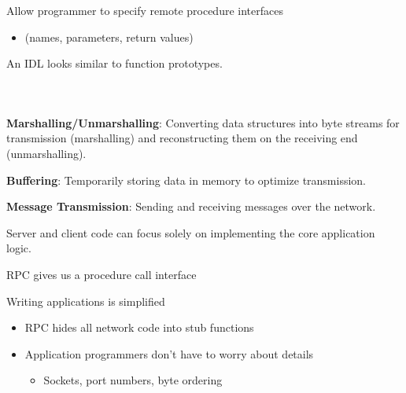 \begin{slide}

	
	Allow programmer to specify remote procedure interfaces
	\begin{itemize}
		\item (names, parameters, return values)
	\end{itemize}

	An IDL looks similar to function prototypes.
	
\end{slide}

\begin{slide}


    \inputminted{python}{Adder.idl}

\end{slide}

\begin{slide}


    \inputminted{python}{server.py}
    \bigskip

    \inputminted{python}{client.py}

\end{slide}

\begin{slide}

    
    \textbf{Marshalling/Unmarshalling}: Converting data structures into byte streams for transmission (marshalling) and reconstructing them on the receiving end (unmarshalling).
    \bigskip

    \textbf{Buffering}: Temporarily storing data in memory to optimize transmission.
    \bigskip

    \textbf{Message Transmission}: Sending and receiving messages over the network.
    \bigskip

    Server and client code can focus solely on implementing the core application logic.

\end{slide}

\begin{slide}


	RPC gives us a procedure call interface
	\bigskip
	
	Writing applications is simplified
	\begin{itemize}
		\item RPC hides all network code into stub functions
		\item Application programmers don't have to worry about details
		\begin{itemize}
			\item Sockets, port numbers, byte ordering
		\end{itemize}
	\end{itemize}
	
\end{slide}

